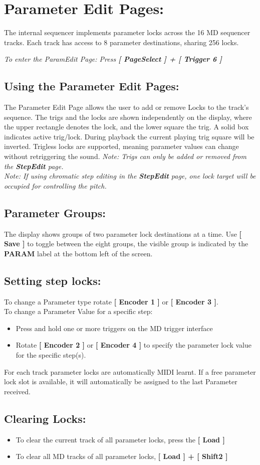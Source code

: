 \chapter{Parameter Edit Pages:}
The internal sequencer implements parameter locks across the 16 MD sequencer tracks. Each track has access to 8 parameter destinations, sharing 256 locks.

\textit{To enter the ParamEdit Page: Press \textbf{[ PageSelect ] + [ Trigger 6 ]}}

\section{Using the Parameter Edit Pages:}
The Parameter Edit Page allows the user to add or remove Locks to the track’s sequence. The trigs and the locks are shown independently on the display, where the upper rectangle denotes the lock, and the lower square the trig.
A solid box indicates active trig/lock. During playback the current playing trig square will be inverted.
Trigless locks are supported, meaning parameter values can change without retriggering the sound.
\newpage
\textit{Note: Trigs can only be added or removed from the \textbf{StepEdit} page.}\\
\textit{Note: If using chromatic step editing in the \textbf{StepEdit} page, one lock target will be occupied for controlling the pitch.}
\section{Parameter Groups:}
The display shows groups of two parameter lock destinations at a time. Use \textbf{[ Save ]} to toggle between the eight groups, the visible group is indicated by the \textbf{PARAM} label at the bottom left of the screen.
\section{Setting step locks:}
To change a Parameter type rotate \textbf{[ Encoder 1 ]} or \textbf{[ Encoder 3 ]}.\\
To change a Parameter Value for a specific step:
\begin{itemize}
\item Press and hold one or more triggers on the MD trigger interface
\item Rotate \textbf{[ Encoder 2 ]} or \textbf{[ Encoder 4 ]} to specify the parameter lock value for the specific step(s).
\end{itemize}
For each track parameter locks are automatically MIDI learnt. If a free parameter lock slot is available, it will automatically be assigned to the last Parameter received. 
\section{Clearing Locks:}
\begin{itemize}
\item To clear the current track of all parameter locks, press the \textbf{[ Load  ]}
\item To clear all MD tracks of all parameter locks, \textbf{[ Load ] + [ Shift2 ]}
\end{itemize}